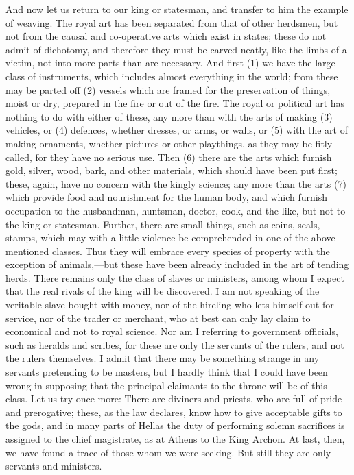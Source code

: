 \documentclass[11pt,letter]{article}
\begin{document}
\par  And now let us return to our king or statesman, and transfer to him the example of weaving. The royal art has been separated from that of other herdsmen, but not from the causal and co-operative arts which exist in states; these do not admit of dichotomy, and therefore they must be carved neatly, like the limbs of a victim, not into more parts than are necessary. And first (1) we have the large class of instruments, which includes almost everything in the world; from these may be parted off (2) vessels which are framed for the preservation of things, moist or dry, prepared in the fire or out of the fire. The royal or political art has nothing to do with either of these, any more than with the arts of making (3) vehicles, or (4) defences, whether dresses, or arms, or walls, or (5) with the art of making ornaments, whether pictures or other playthings, as they may be fitly called, for they have no serious use. Then (6) there are the arts which furnish gold, silver, wood, bark, and other materials, which should have been put first; these, again, have no concern with the kingly science; any more than the arts (7) which provide food and nourishment for the human body, and which furnish occupation to the husbandman, huntsman, doctor, cook, and the like, but not to the king or statesman. Further, there are small things, such as coins, seals, stamps, which may with a little violence be comprehended in one of the above-mentioned classes. Thus they will embrace every species of property with the exception of animals,—but these have been already included in the art of tending herds. There remains only the class of slaves or ministers, among whom I expect that the real rivals of the king will be discovered. I am not speaking of the veritable slave bought with money, nor of the hireling who lets himself out for service, nor of the trader or merchant, who at best can only lay claim to economical and not to royal science. Nor am I referring to government officials, such as heralds and scribes, for these are only the servants of the rulers, and not the rulers themselves. I admit that there may be something strange in any servants pretending to be masters, but I hardly think that I could have been wrong in supposing that the principal claimants to the throne will be of this class. Let us try once more: There are diviners and priests, who are full of pride and prerogative; these, as the law declares, know how to give acceptable gifts to the gods, and in many parts of Hellas the duty of performing solemn sacrifices is assigned to the chief magistrate, as at Athens to the King Archon. At last, then, we have found a trace of those whom we were seeking. But still they are only servants and ministers.
\end{document}
